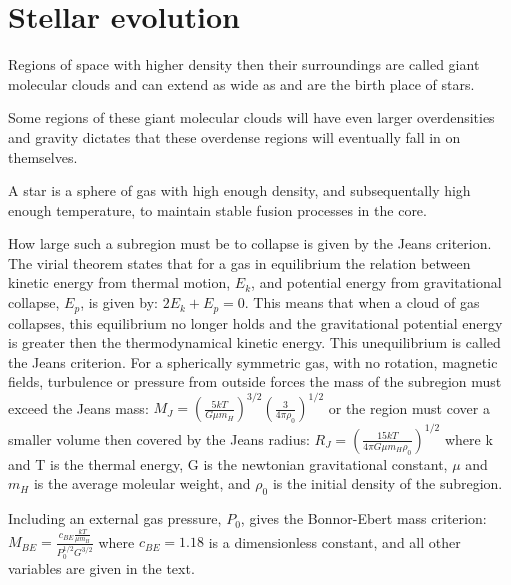 \section{Stellar evolution}






Regions of space with higher density then their surroundings are called giant molecular clouds and can extend as wide as  and are the birth place of stars.

Some regions of these giant molecular clouds will have even larger overdensities and gravity dictates that these overdense regions will eventually fall in on themselves.

A star is a sphere of gas with high enough density, and subsequentally high enough temperature, to maintain stable fusion processes in the core.

How large such a subregion must be to collapse is given by the Jeans criterion. The virial theorem states that for a gas in equilibrium the relation between kinetic energy from thermal motion, $E_k$, and potential energy from gravitational collapse, $E_p$, is given by: $2E_k + E_p = 0$.
This means that when a cloud of gas collapses, this equilibrium no longer holds and the gravitational potential energy is greater then the thermodynamical kinetic energy. This unequilibrium is called the Jeans criterion.
For a spherically symmetric gas, with no rotation, magnetic fields, turbulence or pressure from outside forces the mass of the subregion must exceed the Jeans mass:
$M_J = \left(\frac{5kT}{G\mu m_H}\right)^{3/2}\left(\frac{3}{4\pi \rho_0}\right)^{1/2}$
or the region must cover a smaller volume then covered by the Jeans radius:
$R_J = \left(\frac{15kT}{4\pi G\mu m_H\rho_0}\right)^{1/2}$
where k and T is the thermal energy, G is the newtonian gravitational constant, $\mu$ and $m_H$ is the average moleular weight, and $\rho_0$ is the initial density of the subregion.

Including an external gas pressure, $P_0$, gives the Bonnor-Ebert mass criterion:
$M_{BE} = \frac{c_{BE}\frac{kT}{\mu m_H}}{P_0^{1/2}G^{3/2}}$
where $c_{BE}=1.18$ is a dimensionless constant, and all other variables are given in the text.

